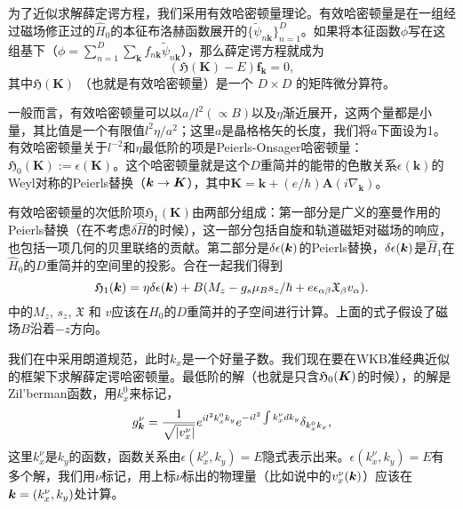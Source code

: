 \begin{appendices}
为了近似求解薛定谔方程，我们采用有效哈密顿量理论\cite{rotheffham,100p}。有效哈密顿量是在一组经过磁场修正过的$\hat{H}_0$的本征布洛赫函数展开的\cite{rotheffham}$\{\tilde{\psi}_{n\boldsymbol{k}}\}_{n=1}^D$。如果将本征函数$\phi$写在这组基下（$\phi=\sum_{n=1}^D\sum_{\boldsymbol{k}}f_{n\boldsymbol{k}}\tilde{\psi}_{n\boldsymbol{k}}$），那么薛定谔方程就成为
\begin{equation}
(\mathfrak{H}(\boldsymbol{K})-E)\boldsymbol{f}_{\boldsymbol{k}}=0,\label{eq:schrodinger}
\end{equation}
其中$\mathfrak{H}(\boldsymbol{K})$ （也就是有效哈密顿量）是一个 $D\times D$ 的矩阵微分算符。 

一般而言，有效哈密顿量可以以$a/l^2 (\propto B)$以及$\eta$渐近展开，这两个量都是小量，其比值是一个有限值$l^2\eta/a^2$；这里$a$是晶格格矢的长度，我们将$a$下面设为1。有效哈密顿量关于$l^{-2}$和$\eta$最低阶的项是Peierls-Onsager哈密顿量：$\mathfrak{H}_{0}(\boldsymbol{K}):=\epsilon(\boldsymbol{K})$。这个哈密顿量就是这个$D$重简并的能带的色散关系$\epsilon(\boldsymbol{k})$的Weyl对称的Peierls替换（$\boldsymbol{k} \rightarrow \boldsymbol{K}$），其中$\boldsymbol{K}=\boldsymbol{k}+(e/\hbar)\boldsymbol{A}(i\nabla_{\boldsymbol{k}})$。

有效哈密顿量的次低阶项$\mathfrak{H}_{1}(\boldsymbol{K})$由两部分组成：第一部分是广义的塞曼作用的Peierls替换（在不考虑$\delta \hat{H}$的时候），这一部分包括自旋和轨道磁矩对磁场的响应，也包括一项几何的贝里联络的贡献。第二部分是$\delta \epsilon(\boldsymbol{k})$的Peierls替换，$\delta \epsilon(\boldsymbol{k})$是$\hat{H}_1$在$\hat{H}_0$的$D$重简并的空间里的投影。合在一起我们得到
\begin{equation}
\mathfrak{H}_1(\boldsymbol{k}) = \eta\delta \epsilon(\boldsymbol{k})+B(M_{z}-g_s\mu_{B}s_{z}/\hbar+e\epsilon_{\alpha\beta}\mathfrak{X}_{\beta}v_{\alpha}). \label{effham1}
\end{equation}
中的$M_z$, $s_z$, $\mathfrak{X}$ 和 $v$应该在$\hat{H}_0$的$D$重简并的子空间进行计算。上面的式子假设了磁场$B$沿着$-z$方向。

我们在中采用朗道规范，此时$k_x$是一个好量子数。我们现在要在WKB准经典近似的框架下求解薛定谔哈密顿量。最低阶的解（也就是只含$\mathfrak{H}_0(\boldsymbol{K})$的时候），的解是Zil'berman函数\cite{zilberman}，用$k_x^0$来标记，
\begin{equation}
    g_{\bk}^\nu=\frac{1}{\sqrt{|v_x^\nu|}}e^{il^2k_x^0k_y}e^{-il^{2}\int k_x^\nu dk_y}\delta_{k_x^0 k_x},\la{zilberman}
\end{equation}
这里$k_x^\nu$是$k_y$的函数，函数关系由$\epsilon(k_x^\nu,k_y)=E$隐式表示出来。$\epsilon(k_x^\nu,k_y)=E$有多个解，我们用$\nu$标记，用上标$\nu$标出的物理量（比如说中的$v_x^\nu(\boldsymbol{k})$）应该在$\boldsymbol{k} = (k_x^\nu, k_y)$处计算。


\end{appendices}
